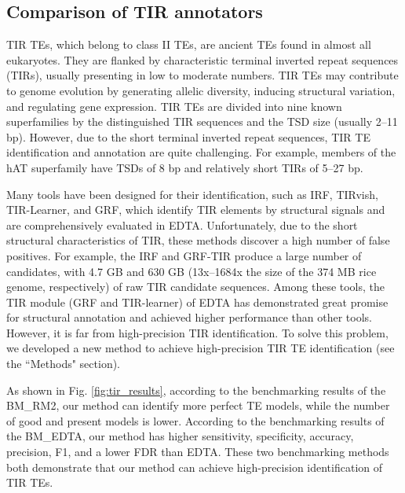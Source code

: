 \documentclass{bmcart}
\begin{document}
\subsection*{Comparison of TIR annotators}
TIR TEs, which belong to class II TEs, are ancient TEs found in almost all eukaryotes. They are flanked by characteristic terminal inverted repeat sequences (TIRs), usually presenting in low to moderate numbers\cite{wicker2007unified}. TIR TEs may contribute to genome evolution by generating allelic diversity, inducing structural variation, and regulating gene expression\cite{su2019tir}. TIR TEs are divided into nine known superfamilies by the distinguished TIR sequences and the TSD size (usually 2–11 bp). However, due to the short terminal inverted repeat sequences, TIR TE identification and annotation are quite challenging. For example, members of the hAT superfamily have TSDs of 8 bp and relatively short TIRs of 5–27 bp\cite{kempken2001hat}.

Many tools have been designed for their identification, such as IRF\cite{warburton2004inverted}, TIRvish\cite{gremme2013genometools}, TIR-Learner\cite{su2019tir}, and GRF\cite{shi2019generic}, which identify TIR elements by structural signals and are comprehensively evaluated in EDTA. Unfortunately, due to the short structural characteristics of TIR, these methods discover a high number of false positives. For example, the IRF and GRF-TIR produce a large number of candidates, with 4.7 GB and 630 GB (13x–1684x the size of the 374 MB rice genome, respectively) of raw TIR candidate sequences. Among these tools, the TIR module (GRF and TIR-learner) of EDTA has demonstrated great promise for structural annotation and achieved higher performance than other tools\cite{ou2019benchmarking}. However, it is far from high-precision TIR identification. To solve this problem, we developed a new method to achieve high-precision TIR TE identification (see the ``Methods" section).

As shown in Fig. \ref{fig:tir_results}, according to the benchmarking results of the BM\_RM2, our method can identify more perfect TE models, while the number of good and present models is lower. According to the benchmarking results of the BM\_EDTA, our method has higher sensitivity, specificity, accuracy, precision, F1, and a lower FDR than EDTA. These two benchmarking methods both demonstrate that our method can achieve high-precision identification of TIR TEs.
\end{document}
